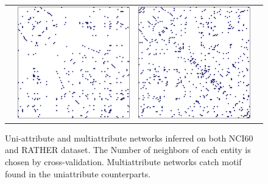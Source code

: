 \begin{figure}[htbp!]
\begin{tabular}{@{}lccc@{}}
    & \includegraphics[width=.3\textwidth]{figures/exprNet_RATHER}
    & \includegraphics[width=.3\textwidth]{figures/bivarNet_RATHER} \\
  \end{tabular}
  \caption{Uni-attribute and multiattribute networks inferred on both
    NCI60 and RATHER dataset. The Number of neighbors of each entity
    is chosen by cross-validation. Multiattribute networks catch motif
    found in the uniattribute counterparts.}
  \label{fig:networks}
\end{figure}



